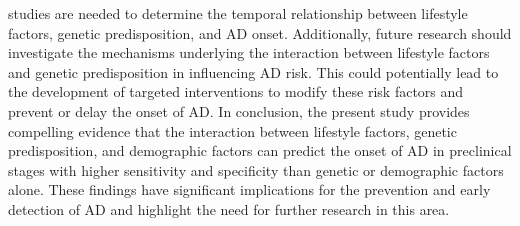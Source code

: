 \documentclass[conference]{IEEEtran}
\begin{document}
studies are needed to determine the temporal relationship between lifestyle factors, genetic predisposition, and AD onset. Additionally, future research should investigate the mechanisms underlying the interaction between lifestyle factors and genetic predisposition in influencing AD risk. This could potentially lead to the development of targeted interventions to modify these risk factors and prevent or delay the onset of AD. In conclusion, the present study provides compelling evidence that the interaction between lifestyle factors, genetic predisposition, and demographic factors can predict the onset of AD in preclinical stages with higher sensitivity and specificity than genetic or demographic factors alone. These findings have significant implications for the prevention and early detection of AD and highlight the need for further research in this area.
\end{document}
